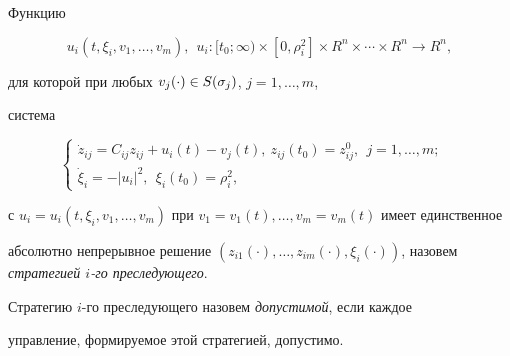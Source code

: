 \begin{defn}


Функцию


$$


u_i(t, \xi_i, v_1,\dotsc,v_m), \ \ u_i: [t_0; \infty) \times [0,


\rho_i^2] \times R^n\times \dotsb \times R^n \rightarrow R^n,


$$


для которой при любых $v_j(\cdot) \in S(\sigma_j)$, $j=1,\dotsc,m$,


система 


$$


\begin{cases}


\Dot z_{ij} = C_{ij}z_{ij} + u_i(t) - v_j(t), \ z_{ij}(t_0) =


z_{ij}^0, \ \ j=1,\dotsc,m; & \ \\


\Dot \xi_i = -|u_i|^2, \ \ \xi_i(t_0) = \rho_i^2, & \


\end{cases}


$$


с $ u_i = u_i(t, \xi_i, v_1,\dotsc,v_m)$ при $v_1 =


v_1(t),\dotsc, v_m = v_m(t)$ имеет единственное


абсолютно непрерывное решение $(z_{i1}(\cdot),\dotsc, z_{im}(\cdot),


\xi_i(\cdot))$, назовем {\it стратегией $i$-го преследующего}.


Стратегию $i$-го преследующего назовем {\it допустимой}, если каждое


управление, формируемое этой стратегией, допустимо.








\end{defn}





